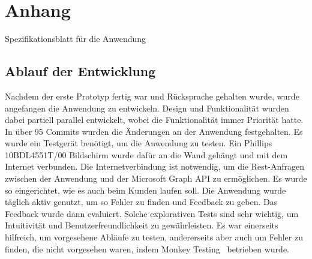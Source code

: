 
\section{Anhang}\label{sec:anhang}
\centering


\caption{Spezifikationsblatt für die Anwendung}
\label{fig:spezifikationsblatt}
\newline
\newline
\subsection{Ablauf der Entwicklung}\label{subsec:ablauf-der-entwicklung}
Nachdem der erste Prototyp fertig war und Rücksprache gehalten wurde, wurde angefangen die Anwendung zu entwickeln.
Design und Funktionalität wurden dabei partiell parallel entwickelt, wobei die Funktionalität immer Priorität hatte.
In über 95 Commits wurden die Änderungen an der Anwendung festgehalten.
\newline
Es wurde ein Testgerät benötigt, um die Anwendung zu testen.
Ein Phillips 10BDL4551T/00 Bildschirm wurde dafür an die Wand gehängt und mit dem Internet verbunden.
Die Internetverbindung ist notwendig, um die Rest-Anfragen zwischen der Anwendung und der Microsoft Graph API zu ermöglichen.
Es wurde so eingerichtet, wie es auch beim Kunden laufen soll.
\newline
Die Anwendung wurde täglich aktiv genutzt, um so Fehler zu finden und Feedback zu geben.
Das Feedback wurde dann evaluiert.
Solche explorativen Tests sind sehr wichtig, um Intuitivität und Benutzerfreundlichkeit zu gewährleisten.
Es war einerseits hilfreich, um vorgesehene Abläufe zu testen, andererseits aber auch um Fehler zu finden, die nicht vorgesehen waren, indem Monkey Testing~\cite{Monkey-Testing-Book1} betrieben wurde.
\newline
